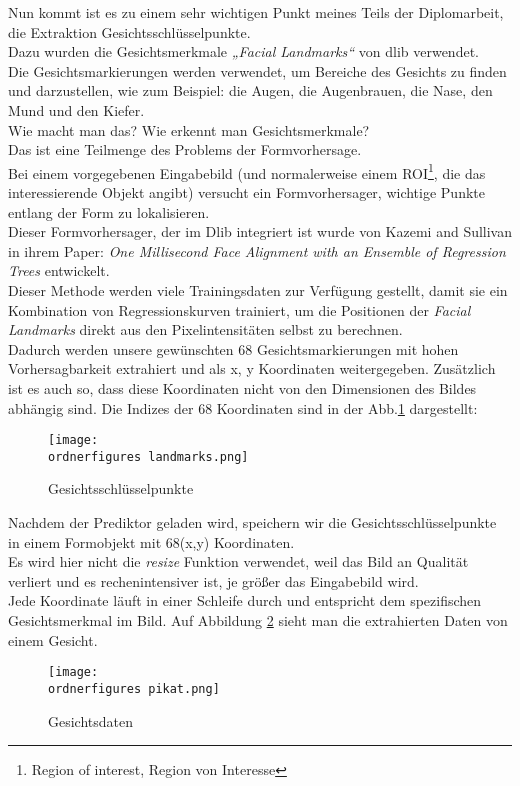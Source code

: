 Nun kommt ist es zu einem sehr wichtigen Punkt meines Teils der Diplomarbeit, die Extraktion Gesichtsschlüsselpunkte. \\
Dazu wurden die Gesichtsmerkmale \textit{„Facial Landmarks“} von dlib verwendet.
\\
Die Gesichtsmarkierungen werden verwendet, um Bereiche des Gesichts zu finden
und darzustellen, wie zum Beispiel: die Augen, die Augenbrauen, die Nase, den
Mund und den Kiefer. \\
Wie macht man das? Wie erkennt man Gesichtsmerkmale? \\Das ist eine Teilmenge
des Problems der Formvorhersage.\\ Bei einem vorgegebenen Eingabebild (und
normalerweise einem ROI\footnote{Region of interest, Region von Interesse}, die
das interessierende Objekt angibt) versucht ein Formvorhersager, wichtige Punkte
entlang der Form zu lokalisieren. \\
Dieser Formvorhersager, der im Dlib integriert ist wurde von Kazemi and Sullivan
in ihrem Paper: \textit{One Millisecond Face Alignment with an Ensemble of
	Regression Trees} entwickelt.\cite{Kazemi2014OneMF} \\
Dieser Methode werden viele Trainingsdaten zur Verfügung gestellt, damit sie ein Kombination von Regressionskurven trainiert, um die Positionen der \textit{Facial Landmarks} direkt aus den Pixelintensitäten selbst zu berechnen.\cite{Kazemi2014OneMF} \\

Dadurch werden unsere gewünschten 68 Gesichtsmarkierungen mit hohen
Vorhersagbarkeit extrahiert und als x, y Koordinaten weitergegeben. 
Zusätzlich ist es auch so, dass diese Koordinaten nicht von den
Dimensionen des Bildes abhängig sind. 
Die Indizes der 68 Koordinaten sind in der Abb.\ref{fig:landmarks} dargestellt:
\\

\begin{figure}[H]
	\texttt{[image: \\ordnerfigures landmarks.png]}
	\centering
	\caption{Gesichtsschlüsselpunkte \cite{Kazemi2014OneMF}}
	\label{fig:landmarks}
\end{figure}

Nachdem der Prediktor geladen wird, speichern wir die Gesichtsschlüsselpunkte in einem Formobjekt
mit 68(x,y) Koordinaten. \\
Es wird hier nicht die \textit{resize} Funktion verwendet, weil das Bild an Qualität verliert
und es rechenintensiver ist, je größer das Eingabebild wird. \\
Jede Koordinate läuft in einer Schleife durch und entspricht dem spezifischen
Gesichtsmerkmal im Bild. Auf Abbildung \ref{fig:data} sieht man die extrahierten Daten von einem Gesicht. \\
\begin{figure}[H]
	\texttt{[image: \\ordnerfigures pikat.png]}
	\centering
	\caption{Gesichtsdaten}
	\label{fig:data}
\end{figure}



